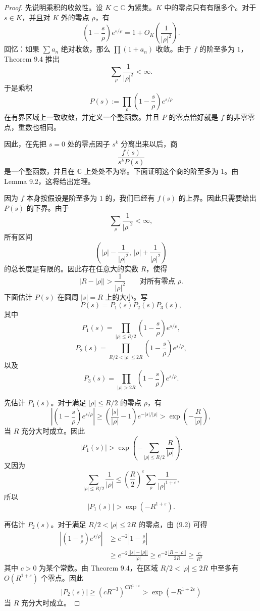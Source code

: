 \begin{proof}
	先说明乘积的收敛性。设 $K\subset\mathbb C$ 为紧集。$K$ 中的零点只有有限多个。对于 $s\in K$，并且对 $K$ 外的零点 $\rho$，有
	\[
		\left(1-\frac{s}{\rho}\right)e^{s/\rho}
		=
		1+O_K\left(\frac{1}{|\rho|^2}\right).
	\]
	回忆：如果 $\sum a_n$ 绝对收敛，那么 $\prod(1+a_n)$ 收敛。由于 $f$ 的阶至多为 $1$，Theorem 9.4 推出
	\[
		\sum_\rho\frac1{|\rho|^2}<\infty.
	\]
	于是乘积
	\[
		P(s):=
		\prod_\rho
		\left(1-\frac{s}{\rho}\right)e^{s/\rho}
	\]
	在有界区域上一致收敛，并定义一个整函数。并且 $P$ 的零点恰好就是 $f$ 的非零零点，重数也相同。

	因此，在先把 $s=0$ 处的零点因子 $s^k$ 分离出来以后，商
	\[
		\frac{f(s)}{s^kP(s)}
	\]
	是一个整函数，并且在 $\mathbb C$ 上处处不为零。下面证明这个商的阶至多为 $1$。由 Lemma 9.2，这将给出定理。

	因为 $f$ 本身按假设是阶至多为 $1$ 的，我们已经有 $f(s)$ 的上界。因此只需要给出 $P(s)$ 的下界。由于
	\[
		\sum_\rho\frac1{|\rho|^2}<\infty,
	\]
	所有区间
	\[
		\left(|\rho|-\frac1{|\rho|^2},\,|\rho|+\frac1{|\rho|^2}\right)
	\]
	的总长度是有限的。因此存在任意大的实数 $R$，使得
	\begin{equation}
		\bigl|R-|\rho|\bigr|>\frac1{|\rho|^2}
		\qquad
		\text{对所有零点 }\rho.
	\tag{9.2}
	\end{equation}
	下面估计 $P(s)$ 在圆周 $|s|=R$ 上的大小。写
	\[
		P(s)=P_1(s)P_2(s)P_3(s),
	\]
	其中
	\[
		P_1(s)=
		\prod_{|\rho|\leq R/2}
		\left(1-\frac{s}{\rho}\right)e^{s/\rho},
	\]
	\[
		P_2(s)=
		\prod_{R/2<|\rho|\leq 2R}
		\left(1-\frac{s}{\rho}\right)e^{s/\rho},
	\]
	以及
	\[
		P_3(s)=
		\prod_{|\rho|>2R}
		\left(1-\frac{s}{\rho}\right)e^{s/\rho}.
	\]

	先估计 $P_1(s)$。对于满足 $|\rho|\leq R/2$ 的零点 $\rho$，有
	\[
		\left|
		\left(1-\frac{s}{\rho}\right)e^{s/\rho}
		\right|
		\geq
		\left(\frac{|s|}{|\rho|}-1\right)e^{-|s|/|\rho|}
		>
		\exp\left(-\frac{R}{|\rho|}\right),
	\]
	当 $R$ 充分大时成立。因此
	\[
		|P_1(s)|
		>
		\exp\left(
		-\sum_{|\rho|\leq R/2}\frac{R}{|\rho|}
		\right).
	\]
	又因为
	\[
		\sum_{|\rho|\leq R/2}\frac1{|\rho|}
		\leq
		\left(\frac{R}{2}\right)^\varepsilon
		\sum_\rho \frac1{|\rho|^{1+\varepsilon}},
	\]
	所以
	\[
		|P_1(s)|>\exp(-R^{1+\varepsilon}).
	\]

	再估计 $P_2(s)$。对于满足 $R/2<|\rho|\leq2R$ 的零点，由 (9.2) 可得
	\[
	\begin{aligned}
		\left|
		\left(1-\frac{s}{\rho}\right)e^{s/\rho}
		\right|
		&\geq
		e^{-2}\left|1-\frac{s}{\rho}\right| \\
		&\geq
		e^{-2}\frac{\bigl||s|-|\rho|\bigr|}{|\rho|}
		\geq
		e^{-2}\frac{\bigl|R-|\rho|\bigr|}{2R}
		\geq
		\frac{c}{R^3}
	\end{aligned}
	\]
	其中 $c>0$ 为某个常数。由 Theorem 9.4，在区域 $R/2<|\rho|\leq2R$ 中至多有 $O(R^{1+\varepsilon})$ 个零点。因此
	\[
		|P_2(s)|
		\geq
		(cR^{-3})^{CR^{1+\varepsilon}}
		>
		\exp(-R^{1+2\varepsilon})
	\]
	当 $R$ 充分大时成立。


\end{proof}
